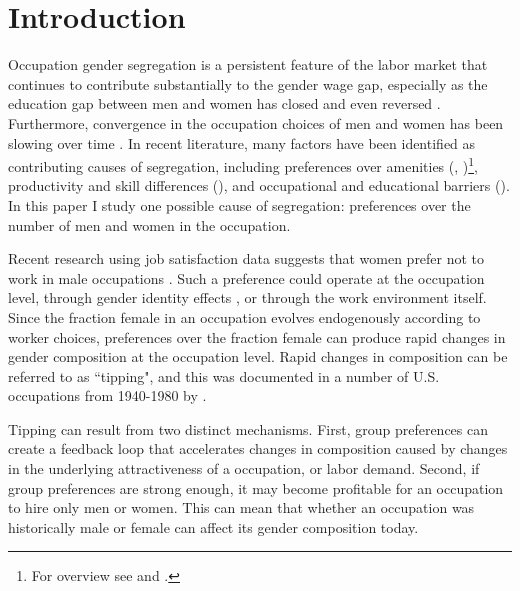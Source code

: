 \documentclass[11pt]{article}
\begin{document}
\newpage
\section{Introduction}








Occupation gender segregation is a persistent feature of the labor market that continues to contribute substantially to the gender wage gap, especially as the education gap between men and women has closed and even reversed \cite{Blau2006, Kahn2016a}. Furthermore, convergence in the occupation choices of men and women has been slowing over time \cite{Blau2013}.  In recent literature, many factors have been identified as contributing causes of segregation, including preferences over amenities (, )\footnote{For overview see  and .}, productivity and skill differences (), and occupational and educational barriers (). In this paper I study one possible cause of segregation: preferences over the number of men and women in the occupation.

Recent research using job satisfaction data suggests that women prefer not to work in male occupations \cite{Usui2008, Lordan2015}. Such a preference could operate at the occupation level, through gender identity effects \cite{Akerlof2000}, or through the work environment itself. Since the fraction female in an occupation evolves endogenously according to worker choices, preferences over the fraction female can produce rapid changes in gender composition at the occupation level. Rapid changes in composition can be referred to as ``tipping", and this was documented in a number of U.S. occupations from 1940-1980 by . 

Tipping can result from two distinct mechanisms. First, group preferences can create a feedback loop that accelerates changes in composition caused by changes in the underlying attractiveness of a occupation, or labor demand. Second, if group preferences are strong enough, it may become profitable for an occupation to hire only men or women. This can mean that whether an occupation was historically male or female can affect its gender composition today.
\end{document}
